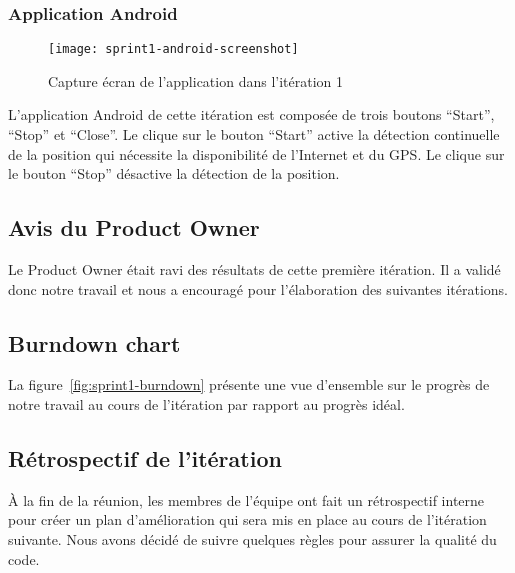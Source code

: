 \subsubsection{Application Android}

\begin{figure}[H]
    \centering
    \texttt{[image: sprint1-android-screenshot]}
    \caption{Capture écran de l'application dans l'itération 1}
\label{fig:sprint1-android-screenshot}
\end{figure}

L'application Android de cette itération est composée de trois boutons
``Start'', ``Stop'' et ``Close''.  Le clique sur le bouton ``Start'' active la
détection continuelle de la position qui nécessite la disponibilité de
l'Internet et du \acrshort{GPS}.  Le clique sur le bouton ``Stop'' désactive la
détection de la position.

\subsection{Avis du Product Owner}

Le Product Owner était ravi des résultats de cette première itération. Il a
validé donc notre travail et nous a encouragé pour l'élaboration des suivantes
itérations.

\subsection{Burndown chart}

La figure~\ref{fig:sprint1-burndown} présente une vue d'ensemble sur le progrès
de notre travail au cours de l'itération par rapport au progrès idéal.



\subsection{Rétrospectif de l'itération}

À la fin de la réunion, les membres de l'équipe ont fait un rétrospectif
interne pour créer un plan d'amélioration qui sera mis en place au cours de
l'itération suivante.  Nous avons décidé de suivre quelques règles pour assurer
la qualité du code.

